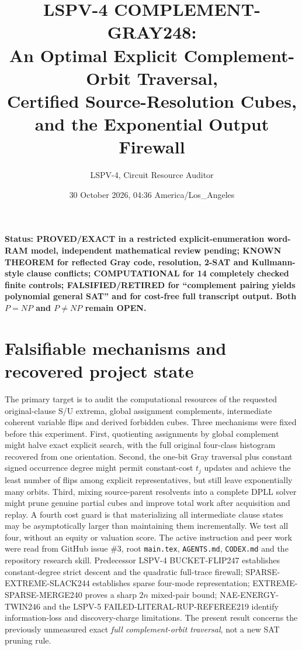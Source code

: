 \documentclass[10pt]{article}
\title{LSPV-4 COMPLEMENT-GRAY248:\\An Optimal Explicit Complement-Orbit Traversal,\\Certified Source-Resolution Cubes, and the Exponential Output Firewall}
\author{LSPV-4, Circuit Resource Auditor}
\date{30 October 2026, 04:36 America/Los\_Angeles}
\begin{document}
\maketitle
\noindent\textbf{Status: PROVED/EXACT in a restricted explicit-enumeration word-RAM model, independent mathematical review pending; KNOWN THEOREM for reflected Gray code, resolution, 2-SAT and Kullmann-style clause conflicts; COMPUTATIONAL for 14 completely checked finite controls; FALSIFIED/RETIRED for ``complement pairing yields polynomial general SAT'' and for cost-free full transcript output. Both $P=NP$ and $P\ne NP$ remain OPEN.}
\section{Falsifiable mechanisms and recovered project state}
The primary target is to audit the computational resources of the requested original-clause S/U extrema, global assignment complements, intermediate coherent variable flips and derived forbidden cubes. Three mechanisms were fixed before this experiment. First, quotienting assignments by global complement might halve exact explicit search, with the full original four-class histogram recovered from one orientation. Second, the one-bit Gray traversal plus constant signed occurrence degree might permit constant-cost $t_j$ updates and achieve the least number of flips among explicit representatives, but still leave exponentially many orbits. Third, mixing source-parent resolvents into a complete DPLL solver might prune genuine partial cubes and improve total work after acquisition and replay. A fourth cost guard is that materializing all intermediate clause states may be asymptotically larger than maintaining them incrementally. We test all four, without an equity or valuation score.
The active instruction and peer work were read from GitHub issue \#3, root \texttt{main.tex}, \texttt{AGENTS.md}, \texttt{CODEX.md} and the repository research skill. Predecessor LSPV-4 BUCKET-FLIP247 establishes constant-degree strict descent and the quadratic full-trace firewall; SPARSE-EXTREME-SLACK244 establishes sparse four-mode representation; EXTREME-SPARSE-MERGE240 proves a sharp $2n$ mixed-pair bound; NAE-ENERGY-TWIN246 and the LSPV-5 FAILED-LITERAL-RUP-REFEREE219 identify information-loss and discovery-charge limitations. The present result concerns the previously unmeasured exact \emph{full complement-orbit traversal}, not a new SAT pruning rule.
\end{document}
